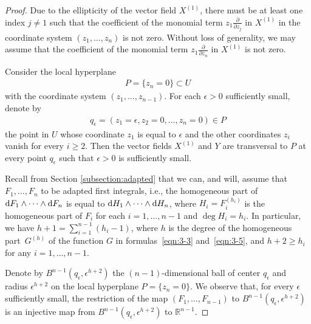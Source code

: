 \documentclass[pdftex]{sigma}
\numberwithin{equation}{section}
\begin{document}
\begin{proof}
Due to the ellipticity of the vector f\/ield $X^{(1)}$, there must be at least
one index $j \neq 1$ such that
the coef\/f\/icient of the monomial term $z_1 \frac{\partial}{\partial z_j}$ in $X^{(1)}$ in the coordinate system $(z_1,\dots, z_n)$ is not zero.
Without loss of generality, we may assume that the coef\/f\/icient of
the monomial term $z_1 \frac{\partial}{\partial z_n}$ in $X^{(1)}$
is not zero.

Consider the local hyperplane
\begin{gather*} P = \{z_n = 0\} \subset U\end{gather*}
with the coordinate system $(z_1,\dots, z_{n-1})$.
For each $\epsilon > 0$ suf\/f\/iciently small, denote by
\begin{gather*} q_{\epsilon} = (z_1= \epsilon, z_2=0,\dots,z_n=0) \in P\end{gather*}
the point in $U$ whose coordinate $z_1$ is equal to $\epsilon$
and the other coordinates $z_i$ vanish for every $i \geq 2$.
Then the vector f\/ields $X^{(1)}$ and $Y$ are transversal to $P$
at every point $q_{\epsilon}$ such that $\epsilon > 0$ is suf\/f\/iciently
small.

Recall from Section \ref{subsection:adapted} that we can, and will,
assume that $F_1,\dots, F_n$ to be adapted f\/irst integrals, i.e.,
the homogeneous part of ${\rm d}F_1 \wedge \dots \wedge {\rm d} F_n$ is equal to
${\rm d}H_1 \wedge \dots \wedge {\rm d} H_n$, where $H_i = F_i^{(h_i)}$ is the homogeneous part
of $F_i$ for each $i=1,\dots, n-1$ and $\deg H_i = h_i$.
In particular, we have
$ h + 1 = \sum\limits_{i=1}^{n-1} (h_i - 1)$,
where $h$ is the degree of the homogeneous part~$G^{(h)}$
of the function $G$ in formulas~\eqref{eqn:3-3} and~\eqref{eqn:3-5},
and $h+2 \geq h_i$ for any $i=1,\dots, n-1$.

Denote by $B^{n-1}(q_\epsilon, \epsilon^{h+2})$ the
$(n-1)$-dimensional ball of center $q_\epsilon$ and radius $\epsilon^{h+2}$
on the local hyperplane $ P = \{z_n = 0\}$. We observe that, for every
$\epsilon $ suf\/f\/iciently small, the restriction of the map
$(F_1,\dots, F_{n-1})$ to $B^{n-1}(q_\epsilon, \epsilon^{h+2})$
is an injective map
from $B^{n-1}(q_\epsilon, \epsilon^{h+2})$ to $\mathbb{R}^{n-1}$.


\end{proof}
\end{document}

